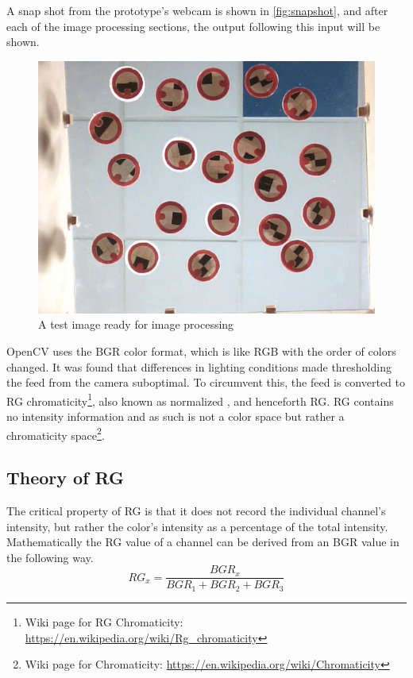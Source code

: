 A snap shot from the prototype's webcam is shown in \autoref{fig:snapshot}, and after each of the image processing sections, the output following this input will be shown.
\begin{figure}[H]
\centering
\includegraphics[width=0.6\linewidth]{figure/Analysis/testimage.jpg}
\caption{A test image ready for image processing}
\label{fig:snapshot}
\end{figure} 
OpenCV uses the BGR color format, which is like RGB with the order of colors changed.
It was found that differences in lighting conditions made thresholding the feed from the camera suboptimal. To circumvent this, the feed is converted to RG chromaticity\footnote{Wiki page for RG Chromaticity: \url{https://en.wikipedia.org/wiki/Rg_chromaticity}}, also known as normalized , and henceforth RG. RG contains no intensity information and as such is not a color space but rather a chromaticity space\footnote{Wiki page for Chromaticity: \url{https://en.wikipedia.org/wiki/Chromaticity}}. 
\subsection{Theory of RG}\label{sec:theoryOfRG}

The critical property of RG is that it does not record the individual channel's intensity, but rather the color's intensity as a percentage of the total intensity. Mathematically the RG value of a channel can be derived from an BGR value in the following way.
\begin{equation} 
 RG_x = \frac{BGR_x}{BGR_1 + BGR_2 + BGR_3}
\end{equation} 

